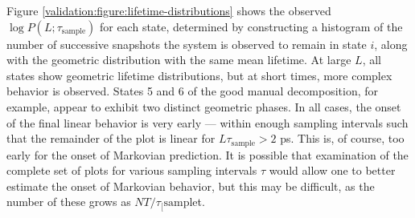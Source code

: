 
Figure \ref{validation:figure:lifetime-distributions} shows the observed $\log P(L;\tau_\mathrm{sample})$ for each state, determined by constructing a histogram of the number of successive snapshots the system is observed to remain in state $i$, along with the geometric distribution with the same mean lifetime.  
At large $L$, all states show geometric lifetime distributions, but at short times, more complex behavior is observed.
States 5 and 6 of the good manual decomposition, for example, appear to exhibit two distinct geometric phases.
In all cases, the onset of the final linear behavior is very early --- within enough sampling intervals such that the remainder of the plot is linear for $L \tau_\mathrm{sample} > 2$ ps.
This is, of course, too early for the onset of Markovian prediction.
It is possible that examination of the complete set of plots for various sampling intervals $\tau$ would allow one to better estimate the onset of Markovian behavior, but this may be difficult, as the number of these grows as $N T / \tau_[\mathrm{sample}$t.







